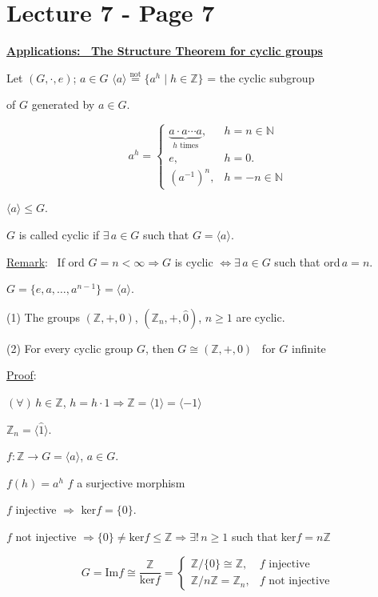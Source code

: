 \section*{Lecture 7 - Page 7}

\noindent\underline{\textbf{Applications: \ The Structure Theorem for cyclic groups}}

\bigskip
\noindent Let $(G,\cdot,e)$; $a\in G$ \quad $\langle a\rangle \overset{\text{not}}{=} \{a^h \mid h\in\mathbb{Z}\}$ = the cyclic subgroup

\noindent of $G$ generated by $a\in G$.

\[
a^h =
\begin{cases}
\underbrace{a\cdot a\cdots a}_{h \text{ times}}, & h=n\in\mathbb{N} \\
e, & h=0. \\
(a^{-1})^n, & h=-n\in\mathbb{N}
\end{cases}
\]

\noindent $\langle a\rangle \leq G$.

\bigskip
\noindent $G$ is called cyclic if $\exists\,a\in G$ such that $G=\langle a\rangle$.

\bigskip
\noindent\underline{Remark}: \ If ord $G=n<\infty \Rightarrow G$ is cyclic $\Leftrightarrow \exists\,a\in G$ such that ord$\,a=n$.

\noindent $G=\{e,a,\ldots,a^{n-1}\} = \langle a\rangle$.

\bigskip
\noindent (1) The groups $(\mathbb{Z},+,0)$, $(\mathbb{Z}_n,+,\hat 0)$, $n\geq 1$ are cyclic.

\noindent (2) For every cyclic group $G$, then $G\cong (\mathbb{Z},+,0)$ \ for $G$ infinite

\bigskip
\noindent\underline{Proof}:

\noindent $(\forall)\,h\in\mathbb{Z}$, $h=h\cdot 1 \Rightarrow \mathbb{Z} = \langle 1\rangle = \langle -1\rangle$

\noindent $\mathbb{Z}_n = \langle\hat 1\rangle$.

\bigskip
\noindent $f: \mathbb{Z}\to G=\langle a\rangle$, $a\in G$.

\noindent $f(h)=a^h$ \quad $f$ a surjective morphism

\bigskip
\noindent $f$ injective $\Rightarrow$ ker$f=\{0\}$.

\noindent $f$ not injective $\Rightarrow \{0\}\neq\text{ker}f\leq\mathbb{Z} \Rightarrow \exists!\,n\geq 1$ such that ker$f=n\mathbb{Z}$

\[
G=\text{Im}f \cong \frac{\mathbb{Z}}{\text{ker}f} =
\begin{cases}
\mathbb{Z}/\{0\} \cong \mathbb{Z}, & f \text{ injective}\\
\mathbb{Z}/n\mathbb{Z} = \mathbb{Z}_n, & f \text{ not injective}
\end{cases}
\]

